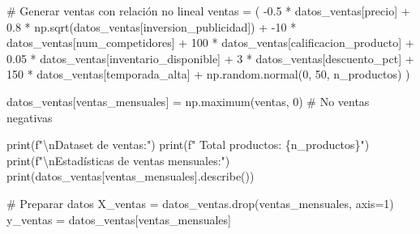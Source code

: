 \documentclass[
  doc,
  floatsintext,
  longtable,
  a4paper,
  nolmodern,
  notxfonts,
  notimes,
  12pt,
  colorlinks=true,linkcolor=blue,citecolor=blue,urlcolor=blue]{apa7}
\newenvironment{Shaded}{\begin{snugshade}}{\end{snugshade}}
\newcommand{\BuiltInTok}[1]{\textcolor[rgb]{0.00,0.23,0.31}{#1}}
\newcommand{\CharTok}[1]{\textcolor[rgb]{0.13,0.47,0.30}{#1}}
\newcommand{\CommentTok}[1]{\textcolor[rgb]{0.37,0.37,0.37}{#1}}
\newcommand{\DecValTok}[1]{\textcolor[rgb]{0.68,0.00,0.00}{#1}}
\newcommand{\FloatTok}[1]{\textcolor[rgb]{0.68,0.00,0.00}{#1}}
\newcommand{\NormalTok}[1]{\textcolor[rgb]{0.00,0.23,0.31}{#1}}
\newcommand{\OperatorTok}[1]{\textcolor[rgb]{0.37,0.37,0.37}{#1}}
\newcommand{\SpecialCharTok}[1]{\textcolor[rgb]{0.37,0.37,0.37}{#1}}
\newcommand{\SpecialStringTok}[1]{\textcolor[rgb]{0.13,0.47,0.30}{#1}}
\newcommand{\StringTok}[1]{\textcolor[rgb]{0.13,0.47,0.30}{#1}}
\begin{document}
\begin{Shaded}
\begin{Highlighting}[]
\CommentTok{\# Generar ventas con relación no lineal}
\NormalTok{ventas }\OperatorTok{=}\NormalTok{ (}
    \OperatorTok{{-}}\FloatTok{0.5} \OperatorTok{*}\NormalTok{ datos\_ventas[}\StringTok{\textquotesingle{}precio\textquotesingle{}}\NormalTok{] }\OperatorTok{+}
    \FloatTok{0.8} \OperatorTok{*}\NormalTok{ np.sqrt(datos\_ventas[}\StringTok{\textquotesingle{}inversion\_publicidad\textquotesingle{}}\NormalTok{]) }\OperatorTok{+}
    \OperatorTok{{-}}\DecValTok{10} \OperatorTok{*}\NormalTok{ datos\_ventas[}\StringTok{\textquotesingle{}num\_competidores\textquotesingle{}}\NormalTok{] }\OperatorTok{+}
    \DecValTok{100} \OperatorTok{*}\NormalTok{ datos\_ventas[}\StringTok{\textquotesingle{}calificacion\_producto\textquotesingle{}}\NormalTok{] }\OperatorTok{+}
    \FloatTok{0.05} \OperatorTok{*}\NormalTok{ datos\_ventas[}\StringTok{\textquotesingle{}inventario\_disponible\textquotesingle{}}\NormalTok{] }\OperatorTok{+}
    \DecValTok{3} \OperatorTok{*}\NormalTok{ datos\_ventas[}\StringTok{\textquotesingle{}descuento\_pct\textquotesingle{}}\NormalTok{] }\OperatorTok{+}
    \DecValTok{150} \OperatorTok{*}\NormalTok{ datos\_ventas[}\StringTok{\textquotesingle{}temporada\_alta\textquotesingle{}}\NormalTok{] }\OperatorTok{+}
\NormalTok{    np.random.normal(}\DecValTok{0}\NormalTok{, }\DecValTok{50}\NormalTok{, n\_productos)}
\NormalTok{)}

\NormalTok{datos\_ventas[}\StringTok{\textquotesingle{}ventas\_mensuales\textquotesingle{}}\NormalTok{] }\OperatorTok{=}\NormalTok{ np.maximum(ventas, }\DecValTok{0}\NormalTok{)  }\CommentTok{\# No ventas negativas}

\BuiltInTok{print}\NormalTok{(}\SpecialStringTok{f"}\CharTok{\textbackslash{}n}\SpecialStringTok{Dataset de ventas:"}\NormalTok{)}
\BuiltInTok{print}\NormalTok{(}\SpecialStringTok{f"  Total productos: }\SpecialCharTok{\{}\NormalTok{n\_productos}\SpecialCharTok{\}}\SpecialStringTok{"}\NormalTok{)}
\BuiltInTok{print}\NormalTok{(}\SpecialStringTok{f"}\CharTok{\textbackslash{}n}\SpecialStringTok{Estadísticas de ventas mensuales:"}\NormalTok{)}
\BuiltInTok{print}\NormalTok{(datos\_ventas[}\StringTok{\textquotesingle{}ventas\_mensuales\textquotesingle{}}\NormalTok{].describe())}

\CommentTok{\# Preparar datos}
\NormalTok{X\_ventas }\OperatorTok{=}\NormalTok{ datos\_ventas.drop(}\StringTok{\textquotesingle{}ventas\_mensuales\textquotesingle{}}\NormalTok{, axis}\OperatorTok{=}\DecValTok{1}\NormalTok{)}
\NormalTok{y\_ventas }\OperatorTok{=}\NormalTok{ datos\_ventas[}\StringTok{\textquotesingle{}ventas\_mensuales\textquotesingle{}}\NormalTok{]}


\end{Highlighting}
\end{Shaded}
\end{document}
